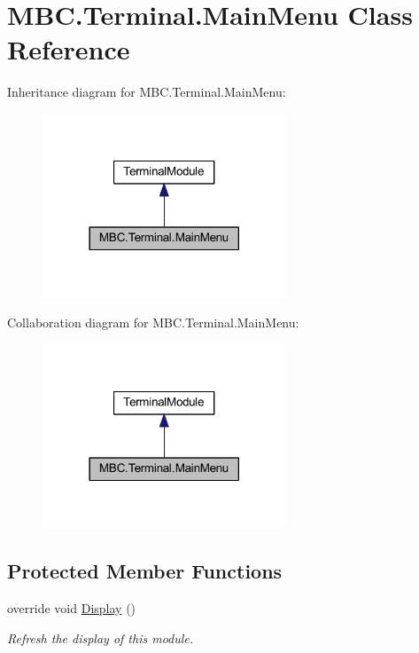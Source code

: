 \hypertarget{class_m_b_c_1_1_terminal_1_1_main_menu}{\section{M\-B\-C.\-Terminal.\-Main\-Menu Class Reference}
\label{class_m_b_c_1_1_terminal_1_1_main_menu}
}


Inheritance diagram for M\-B\-C.\-Terminal.\-Main\-Menu\-:
\nopagebreak
\begin{figure}[H]
\begin{center}
\leavevmode
\includegraphics[width=206pt]{class_m_b_c_1_1_terminal_1_1_main_menu__inherit__graph}
\end{center}
\end{figure}


Collaboration diagram for M\-B\-C.\-Terminal.\-Main\-Menu\-:
\nopagebreak
\begin{figure}[H]
\begin{center}
\leavevmode
\includegraphics[width=206pt]{class_m_b_c_1_1_terminal_1_1_main_menu__coll__graph}
\end{center}
\end{figure}
\subsection*{Protected Member Functions}
\begin{DoxyCompactItemize}
\item 
\hypertarget{class_m_b_c_1_1_terminal_1_1_main_menu_a62e006450c3040234631da90cf7dda92}{override void \hyperlink{class_m_b_c_1_1_terminal_1_1_main_menu_a62e006450c3040234631da90cf7dda92}{Display} ()}\label{class_m_b_c_1_1_terminal_1_1_main_menu_a62e006450c3040234631da90cf7dda92}

\begin{DoxyCompactList}\small\item\em Refresh the display of this module.\end{DoxyCompactList}\end{DoxyCompactItemize}

